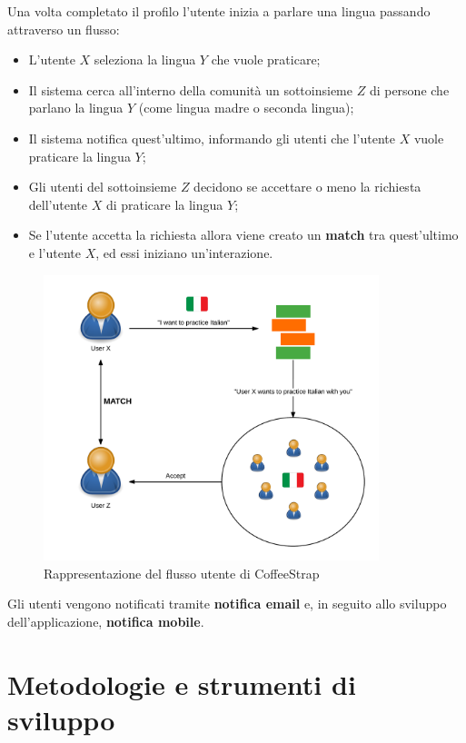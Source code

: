 Una volta completato il profilo l'utente inizia a parlare una lingua passando attraverso un flusso:

\begin{itemize}

\item L'utente $X$ seleziona la lingua $Y$ che vuole praticare;
\item Il sistema cerca all'interno della comunità un sottoinsieme $Z$ di persone che parlano la lingua $Y$ (come lingua madre o seconda lingua);
\item Il sistema notifica quest'ultimo, informando gli utenti che l'utente $X$ vuole praticare la lingua $Y$;
\item Gli utenti del sottoinsieme $Z$ decidono se accettare o meno la richiesta dell'utente $X$ di praticare la lingua $Y$;
\item Se l'utente accetta la richiesta allora viene creato un \textbf{match} tra quest'ultimo e l'utente $X$, ed essi iniziano un'interazione.

\end{itemize}

\begin{figure}[htp]
\centering
\includegraphics[width=9.75cm]{../immagini/coffeestrap-flow}
\caption{Rappresentazione del flusso utente di CoffeeStrap}
\end{figure}

Gli utenti vengono notificati tramite \textbf{notifica email} e, in seguito allo sviluppo dell'applicazione, \textbf{notifica mobile}.

\section{Metodologie e strumenti di sviluppo}

